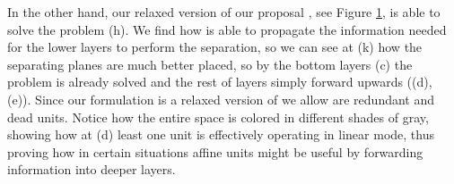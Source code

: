 \begin{figure}
{{    %
    }
    \parbox{.195\textwidth}{%
    }
  }
    \caption{\SepLayer}
    \label{fig:moonsLayerwise}
\end{figure}


In the other hand, our relaxed version of our proposal \SepLayer, see Figure \ref{fig:moonsLayerwise}, is able to solve the problem (h). We find how is able to propagate the information needed for the lower layers to perform the separation, so we can see at (k) how the separating planes are much better placed, so by the bottom layers (c) the problem is already solved and the rest of layers simply forward upwards ((d), (e)). Since our formulation \SepLayer is a relaxed version of \SepUnit we allow are redundant and dead units. Notice how the entire space is colored in different shades of gray, showing how at (d) least one unit is effectively operating in linear mode, thus proving how in certain situations affine units might be useful by forwarding information into deeper layers. 

